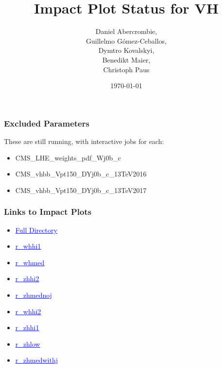\documentclass{beamer}
\author[D. Abercrombie]{
  Daniel Abercrombie, \\
  Guillelmo G\'omez-Ceballos, \\
  Dymtro Kovalskyi, \\
  Benedikt Maier, \\
  Christoph Paus
}
\title{\bf \sffamily Impact Plot Status for VH}
\date{\today}
\newcommand{\beginbackup}{
  \newcounter{framenumbervorappendix}
  \setcounter{framenumbervorappendix}{\value{framenumber}}
}
\newcommand{\backupend}{
  \addtocounter{framenumbervorappendix}{-\value{framenumber}}
  \addtocounter{framenumber}{\value{framenumbervorappendix}}
}
\newcommand{\link}[2]{\href{#2}{\textcolor{blue}{\underline{#1}}}}
\begin{document}
\begin{frame}
  \titlepage
\end{frame}

\begin{frame}
  \frametitle{Excluded Parameters}

  These are still running, with interactive jobs for each:

  \begin{itemize}
  \item CMS\_LHE\_weights\_pdf\_Wj0b\_c
  \item CMS\_vhbb\_Vpt150\_DYj0b\_c\_13TeV2016
  \item CMS\_vhbb\_Vpt150\_DYj0b\_c\_13TeV2017
  \end{itemize}

\end{frame}

\begin{frame}
  \frametitle{Links to Impact Plots}

  \begin{itemize}
  \item \link{Full Directory}{http://t3serv001.mit.edu/~dabercro/misc/impacts/}
  \item \link{r\_whhi1}{http://t3serv001.mit.edu/~dabercro/misc/impacts/impacts_r_whhi1.pdf}
  \item \link{r\_whmed}{http://t3serv001.mit.edu/~dabercro/misc/impacts/impacts_r_whmed.pdf}
  \item \link{r\_zhhi2}{http://t3serv001.mit.edu/~dabercro/misc/impacts/impacts_r_zhhi2.pdf}
  \item \link{r\_zhmednoj}{http://t3serv001.mit.edu/~dabercro/misc/impacts/impacts_r_zhmednoj.pdf}
  \item \link{r\_whhi2}{http://t3serv001.mit.edu/~dabercro/misc/impacts/impacts_r_whhi2.pdf}
  \item \link{r\_zhhi1}{http://t3serv001.mit.edu/~dabercro/misc/impacts/impacts_r_zhhi1.pdf}
  \item \link{r\_zhlow}{http://t3serv001.mit.edu/~dabercro/misc/impacts/impacts_r_zhlow.pdf}
  \item \link{r\_zhmedwithj}{http://t3serv001.mit.edu/~dabercro/misc/impacts/impacts_r_zhmedwithj.pdf}
  \end{itemize}

\end{frame}

\begin{comment}
\beginbackup

\begin{frame}
  \centering
    {\Huge \bf\sffamily Backup Slides}
\end{frame}



\backupend
\end{comment}
\end{document}
